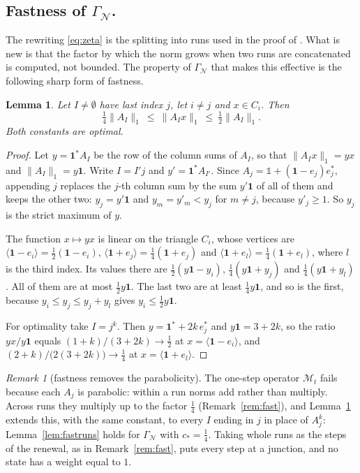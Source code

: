 \documentclass[11pt]{amsart}
\newcommand{\id}{\mathds{1}}
\newtheorem{lemma}[proposition]{Lemma}
\theoremstyle{definition}
\theoremstyle{remark}
\newtheorem{remark}[proposition]{Remark}
\newcommand{\one}{\mathbf 1}
\newcommand{\GN}{\Gamma_{\mathcal N}}
\newcommand{\norm}[1]{\lVert #1\rVert}
\newcommand{\pr}[1]{\langle #1\rangle}
\begin{document}
\subsection*{Fastness of $\GN$.}
The rewriting \eqref{eq:zeta} is the splitting into runs used in the proof of \cite[Thm.~1]{DL15JGA}. What is new is that the factor by which the norm grows when two runs are concatenated is computed, not bounded. The property of $\GN$ that makes this effective is the following sharp form of fastness.

\begin{lemma}\label{lem:junction}
Let $I\neq\emptyset$ have last index $j$, let $i\neq j$ and $x\in C_i$. Then
\[
  \tfrac14\norm{A_I}_1\ \le\ \norm{A_Ix}_1\ \le\ \tfrac12\norm{A_I}_1 .
\]
Both constants are optimal.
\end{lemma}

\begin{proof}
Let $y=\one^*A_I$ be the row of the column sums of $A_I$, so that $\norm{A_Ix}_1=yx$ and $\norm{A_I}_1=y\one$. Write $I=I'j$ and
$y'=\one^*A_{I'}$. Since $A_j=\id+(\one-e_j)e_j^*$, appending $j$ replaces the $j$-th column sum by the sum $y'\one$ of all of them and keeps the other two: $y_j=y'\one$ and $y_m=y'_m<y_j$ for $m\neq j$, because $y'_j\ge1$. So $y_j$ is the strict maximum of $y$.

The function $x\mapsto yx$ is linear on the triangle $C_i$, whose vertices are $\pr{\one-e_i}=\frac12(\one-e_i)$,
$\pr{\one+e_j}=\frac14(\one+e_j)$ and $\pr{\one+e_l}=\frac14(\one+e_l)$, where $l$ is the third index. Its values there
are $\frac12(y\one-y_i)$, $\frac14(y\one+y_j)$ and $\frac14(y\one+y_l)$. All of them are at most $\frac12y\one$. The last two are at least $\frac14y\one$, and so is the first, because $y_i\le y_j\le y_j+y_l$ gives $y_i\le\frac12y\one$.

For optimality take $I=j^k$. Then $y=\one^*+2k\,e_j^*$ and $y\one=3+2k$, so the ratio $yx/y\one$ equals $(1+k)/(3+2k)\to\frac12$ at $x=\pr{\one-e_i}$, and $(2+k)/\bigl(2(3+2k)\bigr)\to\frac14$ at $x=\pr{\one+e_l}$.
\end{proof}

\begin{remark}[fastness removes the parabolicity]\label{rem:fastN}
The one-step operator $\mathcal M_t$ fails because each $A_j$ is parabolic: within a run norms add rather than multiply. Across runs they multiply up to the factor $\frac14$ (Remark~\ref{rem:fast}), and Lemma~\ref{lem:junction} extends this, with the same constant, to every $I$ ending in $j$ in place of $A_j^k$: Lemma~\ref{lem:fastruns} holds for $\GN$ with $c_*=\frac14$. Taking whole runs as the steps of the renewal, as in Remark~\ref{rem:fast}, puts every step at a junction, and no state has a weight equal to $1$.
\end{remark}
\end{document}
